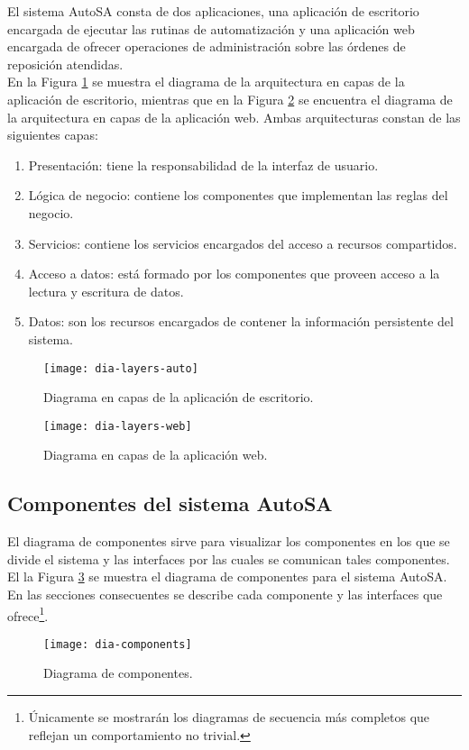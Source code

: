 El sistema AutoSA consta de dos aplicaciones, una aplicación de escritorio encargada de ejecutar las rutinas de automatización y una aplicación web encargada de ofrecer operaciones de administración sobre las órdenes de reposición atendidas.\\
En la Figura \ref{fig:dia-layers-auto} se muestra el diagrama de la arquitectura en capas de la aplicación de escritorio, mientras que en la Figura \ref{fig:dia-layers-web} se encuentra el diagrama de la arquitectura en capas de la aplicación web. Ambas arquitecturas constan de las siguientes capas:
\begin{enumerate}
	\item Presentación: tiene la responsabilidad de la interfaz de usuario.
	\item Lógica de negocio: contiene los componentes que implementan las reglas del negocio.
	\item Servicios: contiene los servicios encargados del acceso a recursos compartidos.
	\item Acceso a datos: está formado por los componentes que proveen acceso a la lectura y escritura de datos.
	\item Datos: son los recursos encargados de contener la información persistente del sistema.
\end{enumerate}

\pagebreak

\begin{figure}[h]
\centering
\texttt{[image: dia-layers-auto]}
\caption{Diagrama en capas de la aplicación de escritorio.}
\label{fig:dia-layers-auto}
\end{figure}

\begin{figure}[h]
\centering
\texttt{[image: dia-layers-web]}
\caption{Diagrama en capas de la aplicación web.}
\label{fig:dia-layers-web}
\end{figure}


\subsection{Componentes del sistema AutoSA}
El diagrama de componentes sirve para visualizar los componentes en los que se divide el sistema y las interfaces por las cuales se comunican tales componentes. El la Figura \ref{fig:dia-components} se muestra el diagrama de componentes para el sistema AutoSA. En las secciones consecuentes se describe cada componente y las interfaces que ofrece\footnote{Únicamente se mostrarán los diagramas de secuencia más completos que reflejan un comportamiento no trivial.}.
\begin{figure}[h]
\centering
\texttt{[image: dia-components]}
\caption{Diagrama de componentes.}
\label{fig:dia-components}
\end{figure}

